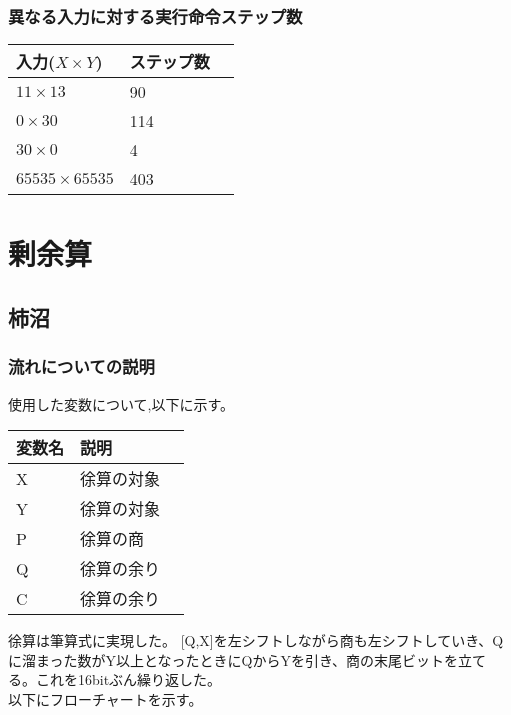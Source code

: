 \documentclass[dvipdfmx,12pt]{jreport}
\begin{document}
\subsubsection{異なる入力に対する実行命令ステップ数}
\begin{table}[h]
  \begin{tabular}{|l|l|l|} \hline
    入力($X \times Y$) & ステップ数 \\ \hline
    $11 \times 13$ & 90 \\ \hline
    $0 \times 30$ & 114 \\ \hline
    $30 \times 0$ & 4 \\ \hline
    $65535 \times 65535$ & 403 \\ \hline
  \end{tabular}
\end{table}

\section*{剰余算}
\subsection*{柿沼}
\subsubsection*{流れについての説明}
使用した変数について,以下に示す。
\begin{table}[h]
  \begin{tabular}{|l|l|l|} \hline
    変数名 & 説明 \\ \hline
    X & 徐算の対象 \\ \hline
    Y & 徐算の対象 \\ \hline
    P & 徐算の商 \\ \hline
    Q & 徐算の余り \\ \hline
    C & 徐算の余り \\ \hline
  \end{tabular}
\end{table}

徐算は筆算式に実現した。
[Q,X]を左シフトしながら商も左シフトしていき、Qに溜まった数がY以上となったときにQからYを引き、商の末尾ビットを立てる。これを16bitぶん繰り返した。 \\

以下にフローチャートを示す。 \\
\end{document}
